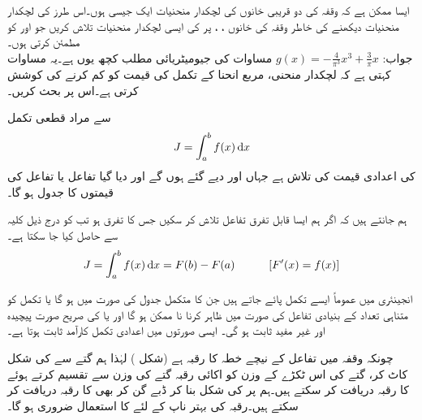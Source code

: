 ایسا ممکن ہے کہ  وقفہ  کی دو قریبی خانوں کی لچکدار منحنیات ایک جیسی ہوں۔اس طرز کی لچکدار منحنیات دیکھنے کی خاطر وقفہ 
 کی  خانوں ، ،  پر  کی ایسی لچکدار منحنیات تلاش کریں جو  اور  کو مطمئن کرتی ہوں۔\\
جواب:\quad
$g(x)=-\tfrac{4}{\pi^3}x^3+\tfrac{3}{\pi}x$
\quad
مساوات  کی جیومیٹریائی مطلب کچھ یوں ہے۔یہ مساوات کہتی ہے کہ لچکدار منحنی، مربع انحنا کے تکمل کی قیمت کو کم کرنے کی کوشش کرتی ہے۔اس پر بحث کریں۔ 

 سے مراد قطعی تکمل
\begin{align}
J=\int_a^b f(x)\dif x
\end{align}
کی اعدادی قیمت  کی تلاش ہے جہاں  اور  دیے گئے ہوں گے اور  دیا گیا تفاعل یا تفاعل کی قیمتوں کا جدول ہو گا۔

ہم جانتے ہیں کہ اگر ہم ایسا قابل تفرق تفاعل  تلاش کر سکیں جس کا تفرق  ہو تب  کو درج ذیل کلیہ سے حاصل کیا جا سکتا ہے۔
\begin{align*}
J=\int_a^b f(x)\dif x=F(b)-F(a)\quad \quad \quad [F'(x)=f(x)]
\end{align*}

انجینئری میں عموماً ایسے تکمل پائے جاتے ہیں جن کا متکمل جدول کی صورت میں ہو گا یا تکمل کو متناہی تعداد کے بنیادی تفاعل کی صورت میں ظاہر کرنا نا ممکن ہو گا اور یا  کی صریح صورت پیچیدہ اور غیر مفید ثابت ہو گی۔ ایسی صورتوں میں اعدادی تکمل کارآمد ثابت ہوتا ہے۔

چونکہ  وقفہ  میں تفاعل  کے نیچے خطہ  کا رقبہ  ہے (شکل ) لہٰذا ہم گتے سے  کی شکل کاٹ کر، گتے کی اس ٹکڑے کے وزن کو اکائی رقبہ گتے کی وزن سے تقسیم کرتے ہوئے  کا رقبہ دریافت کر سکتے ہیں۔ہم   پر  کی شکل بنا کر ڈبے گن  کر بھی  کا رقبہ دریافت کر سکتے ہیں۔رقبہ کی بہتر ناپ کے لئے   کا استعمال ضروری ہو گا۔

